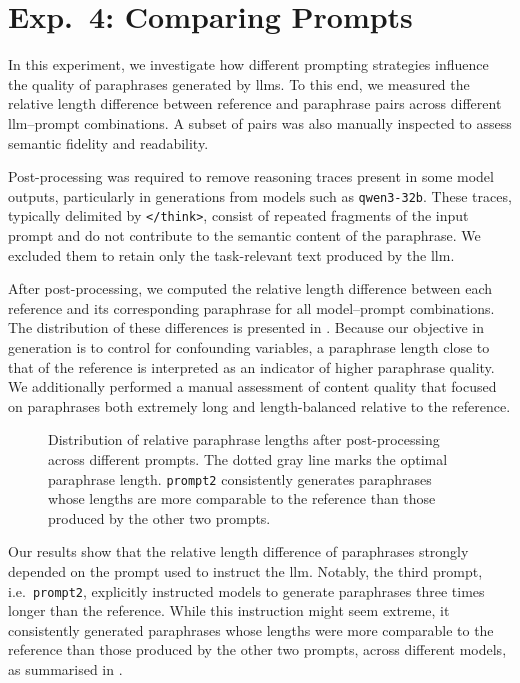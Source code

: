 \section{Exp.\ 4: Comparing Prompts}%
\label{sec:prompt_impact_res}

In this experiment, we investigate how different prompting strategies influence the quality of paraphrases generated by \acp{llm}. 
To this end, we measured the relative length difference between reference and paraphrase pairs across different \ac{llm}–prompt combinations. 
A subset of pairs was also manually inspected to assess semantic fidelity and readability.

Post-processing was required to remove reasoning traces present in some model outputs, particularly in generations from models such as \texttt{qwen3-32b}. 
These traces, typically delimited by \texttt{</think>}, consist of repeated fragments of the input prompt and do not contribute to the semantic content of the paraphrase. 
We excluded them to retain only the task-relevant text produced by the \ac{llm}.

After post-processing, we computed the relative length difference between each reference and its corresponding paraphrase for all model–prompt combinations. 
The distribution of these differences is presented in . 
Because our objective in \imp{} generation is to control for confounding variables, a paraphrase length close to that of the reference is interpreted as an indicator of higher paraphrase quality. 
We additionally performed a manual assessment of content quality that focused on paraphrases both extremely long and length-balanced relative to the reference.

\begin{figure}[H]
    \centering
    
    \caption[Impact of different prompts on paraphrases]{
    Distribution of relative paraphrase lengths after post-processing across different prompts.    
    The dotted gray line marks the optimal paraphrase length.
    \texttt{prompt2} consistently generates paraphrases whose lengths are more comparable to the reference than those produced by the other two prompts.
    }
    \label{fig:prompt_impact_post_processed}
\end{figure}

Our results show that the relative length difference of paraphrases strongly depended on the prompt used to instruct the \ac{llm}. 
Notably, the third prompt, i.e.\ \texttt{prompt2}, explicitly instructed models to generate paraphrases three times longer than the reference. 
While this instruction might seem extreme, it consistently generated paraphrases whose lengths were more comparable to the reference than those produced by the other two prompts, across different models, as summarised in .

